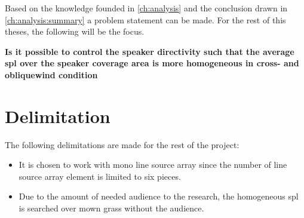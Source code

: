 Based on the knowledge founded in \autoref{ch:analysis} and the conclusion drawn in \autoref{ch:analysis:summary} a problem statement can be made. For the rest of this theses, the following will be the focus.


\textbf{Is it possible to control the speaker directivity such that the average \gls{spl} over the speaker coverage area is more homogeneous in cross- and obliquewind condition}



\section{Delimitation}
The following delimitations are made for the rest of the project:

\begin{itemize}
\item It is chosen to work with mono line source array since the number of line source array element is limited to six pieces.
\item Due to the amount of needed audience to the research, the homogeneous \gls{spl} is searched over mown grass without the audience.
\end{itemize}